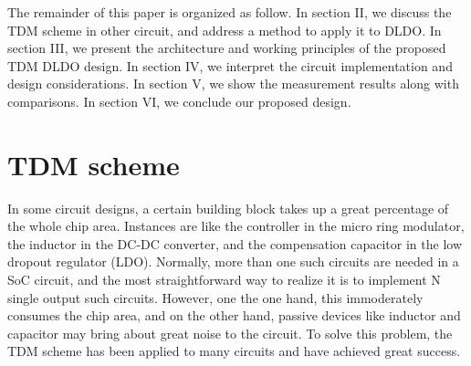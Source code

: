\documentclass[journal]{IEEEtran}
\begin{document}
The remainder of this paper is organized as follow. In section II, we discuss the TDM scheme in other circuit, and address a method to apply it to DLDO. In section III, we present the architecture and working principles of the proposed TDM DLDO design. In section IV, we interpret the circuit implementation and design considerations. In section V, we show the measurement results along with comparisons. In section VI, we conclude our proposed design.
\section{TDM scheme}
In some circuit designs, a certain building block takes up a great percentage of the whole chip area. Instances are like the controller in the micro ring modulator, the inductor in the DC-DC converter, and the compensation capacitor in the low dropout regulator (LDO). Normally, more than one such circuits are needed in a SoC circuit, and the most straightforward way to realize it is to implement N single output such circuits. However, one the one hand, this immoderately consumes the chip area, and on the other hand, passive devices like inductor and capacitor may bring about great noise to the circuit. To solve this problem, the TDM scheme has been applied to many circuits and have achieved great success.
\end{document}
